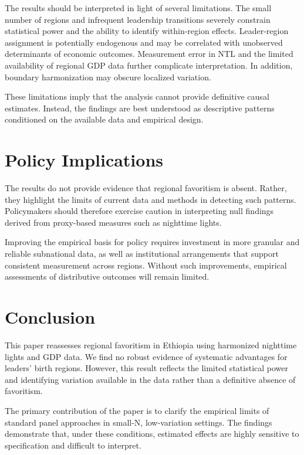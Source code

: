\documentclass[12pt,a4paper]{article}
\begin{document}
The results should be interpreted in light of several limitations. The small number of regions and infrequent leadership transitions severely constrain statistical power and the ability to identify within-region effects. Leader-region assignment is potentially endogenous and may be correlated with unobserved determinants of economic outcomes. Measurement error in NTL and the limited availability of regional GDP data further complicate interpretation. In addition, boundary harmonization may obscure localized variation.

These limitations imply that the analysis cannot provide definitive causal estimates. Instead, the findings are best understood as descriptive patterns conditioned on the available data and empirical design.

\section{Policy Implications}

The results do not provide evidence that regional favoritism is absent. Rather, they highlight the limits of current data and methods in detecting such patterns. Policymakers should therefore exercise caution in interpreting null findings derived from proxy-based measures such as nighttime lights.

Improving the empirical basis for policy requires investment in more granular and reliable subnational data, as well as institutional arrangements that support consistent measurement across regions. Without such improvements, empirical assessments of distributive outcomes will remain limited.

\section{Conclusion}

This paper reassesses regional favoritism in Ethiopia using harmonized nighttime lights and GDP data. We find no robust evidence of systematic advantages for leaders’ birth regions. However, this result reflects the limited statistical power and identifying variation available in the data rather than a definitive absence of favoritism.

The primary contribution of the paper is to clarify the empirical limits of standard panel approaches in small-N, low-variation settings. The findings demonstrate that, under these conditions, estimated effects are highly sensitive to specification and difficult to interpret.
\end{document}
